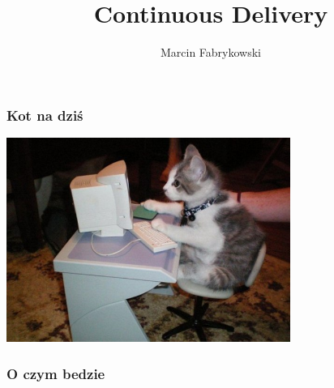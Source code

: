 \documentclass[10pt]{beamer}
\title{Continuous Delivery}
\author{Marcin Fabrykowski}
\institute{Alior Bank S.A.}
\begin{document}
\begin{frame}
\titlepage
\end{frame}
\begin{frame}
\frametitle{Kot na dziś}
\begin{center}
\includegraphics[width=25em]{funny-cat-and-computer_1.jpg}
\end{center}
\end{frame}
\begin{frame}
\frametitle{O czym bedzie}
\tableofcontents
\end{frame}
\end{document}
